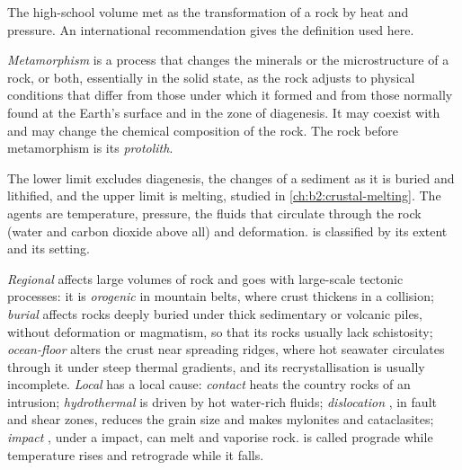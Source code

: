 The high-school volume met  as the transformation of a rock by heat and
pressure. An international recommendation gives the definition used here.

\begin{definition}\label{def:b2:metamorphic-facies:metamorphism}
\emph{Metamorphism} is a process that changes the minerals or the
microstructure of a rock, or both, essentially in the solid state, as the rock adjusts
to physical conditions that differ from those under which it formed and from those
normally found at the Earth's surface and in the zone of diagenesis. It may coexist with
 and may change the chemical composition of the rock. The rock before
metamorphism is its \emph{protolith}.
\end{definition}

The lower limit excludes diagenesis, the changes of a sediment as it is buried and
lithified, and the upper limit is melting, studied in \cref{ch:b2:crustal-melting}. The
agents are temperature, pressure, the fluids that circulate through the rock (water and
carbon dioxide above all) and deformation.  is classified by its extent and
its setting.

\emph{Regional}  affects large volumes of rock and goes with large-scale
tectonic processes: it is \emph{orogenic} in mountain belts, where crust thickens in a
collision; \emph{burial}  affects rocks deeply buried under thick
sedimentary or volcanic piles, without deformation or magmatism, so that its rocks
usually lack schistosity; \emph{ocean-floor}  alters the crust near
spreading ridges, where hot seawater circulates through it under steep thermal
gradients, and its recrystallisation is usually incomplete. \emph{Local} 
has a local cause: \emph{contact}  heats the country rocks of an intrusion;
\emph{hydrothermal}  is driven by hot water-rich fluids;
\emph{dislocation} , in fault and shear zones, reduces the grain size and
makes mylonites and cataclasites; \emph{impact} , under a  impact,
can melt and vaporise rock.  is called prograde while temperature rises and
retrograde while it falls.

